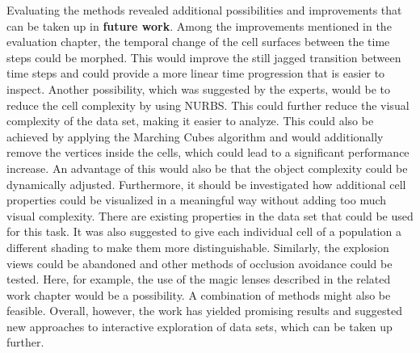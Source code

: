 Evaluating the methods revealed additional possibilities and improvements that can be taken up in \textbf{future work}. Among the improvements mentioned in the evaluation chapter, the temporal change of the cell surfaces between the time steps could be morphed. This would improve the still jagged transition between time steps and could provide a more linear time progression that is easier to inspect. Another possibility, which was suggested by the experts, would be to reduce the cell complexity by using NURBS.
This could further reduce the visual complexity of the data set, making it easier to analyze. This could also be achieved by applying the Marching Cubes algorithm and would additionally remove the vertices inside the cells, which could lead to a significant performance increase. An advantage of this would also be that the object complexity could be dynamically adjusted.
Furthermore, it should be investigated how additional cell properties could be visualized in a meaningful way without adding too much visual complexity. There are existing properties in the data set that could be used for this task. It was also suggested to give each individual cell of a population a different shading to make them more distinguishable. 
Similarly, the explosion views could be abandoned and other methods of occlusion avoidance could be tested. Here, for example, the use of the magic lenses described in the related work chapter would be a possibility. A combination of methods might also be feasible.
Overall, however, the work has yielded promising results and suggested new approaches to interactive exploration of data sets, which can be taken up further.